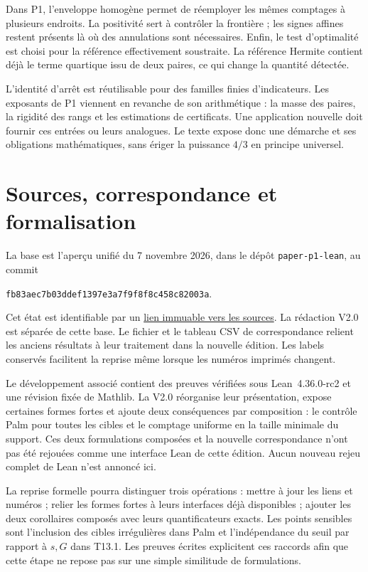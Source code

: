 \documentclass[11pt,a4paper]{article}
\begin{document}
Dans P1, l'enveloppe homogène permet de réemployer les mêmes comptages à plusieurs endroits. La positivité sert à contrôler la frontière ; les signes affines restent présents là où des annulations sont nécessaires. Enfin, le test d'optimalité est choisi pour la référence effectivement soustraite. La référence Hermite contient déjà le terme quartique issu de deux paires, ce qui change la quantité détectée.

L'identité d'arrêt est réutilisable pour des familles finies d'indicateurs. Les exposants de P1 viennent en revanche de son arithmétique : la masse des paires, la rigidité des rangs et les estimations de certificats. Une application nouvelle doit fournir ces entrées ou leurs analogues. Le texte expose donc une démarche et ses obligations mathématiques, sans ériger la puissance $4/3$ en principe universel.

\section{Sources, correspondance et formalisation}

La base est l'aperçu unifié du 7 novembre 2026, dans le dépôt \texttt{paper-p1-lean}, au commit
\begin{center}
\small\texttt{fb83aec7b03ddef1397e3a7f9f8f8c458c82003a}.
\end{center}
Cet état est identifiable par un \href{https://github.com/Vulkin-prog/paper-p1-lean/tree/fb83aec7b03ddef1397e3a7f9f8f8c458c82003a}{lien immuable vers les sources}. La rédaction V2.0 est séparée de cette base. Le fichier  et le tableau CSV de correspondance relient les anciens résultats à leur traitement dans la nouvelle édition. Les labels conservés facilitent la reprise même lorsque les numéros imprimés changent.

Le développement associé contient des preuves vérifiées sous Lean~4.36.0-rc2 et une révision fixée de Mathlib. La V2.0 réorganise leur présentation, expose certaines formes fortes et ajoute deux conséquences par composition : le contrôle Palm pour toutes les cibles et le comptage uniforme en la taille minimale du support. Ces deux formulations composées et la nouvelle correspondance n'ont pas été rejouées comme une interface Lean de cette édition. Aucun nouveau rejeu complet de Lean n'est annoncé ici.

La reprise formelle pourra distinguer trois opérations : mettre à jour les liens et numéros ; relier les formes fortes à leurs interfaces déjà disponibles ; ajouter les deux corollaires composés avec leurs quantificateurs exacts. Les points sensibles sont l'inclusion des cibles irrégulières dans Palm et l'indépendance du seuil par rapport à $s,G$ dans T13.1. Les preuves écrites explicitent ces raccords afin que cette étape ne repose pas sur une simple similitude de formulations.
\end{document}
